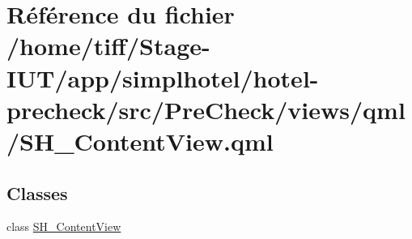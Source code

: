 \hypertarget{SH__ContentView_8qml}{\section{Référence du fichier /home/tiff/\-Stage-\/\-I\-U\-T/app/simplhotel/hotel-\/precheck/src/\-Pre\-Check/views/qml/\-S\-H\-\_\-\-Content\-View.qml}
\label{SH__ContentView_8qml}
}
\subsection*{Classes}
\begin{DoxyCompactItemize}
\item 
class \hyperlink{classSH__ContentView}{S\-H\-\_\-\-Content\-View}
\end{DoxyCompactItemize}
